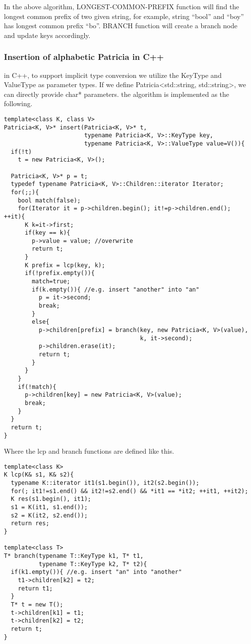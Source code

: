 \documentclass{article}
\begin{document}
In the above algorithm, LONGEST-COMMON-PREFIX function will find the longest
common prefix of two given string, for example, string ``bool'' and ``boy''
has longest common prefix ``bo''. BRANCH function will create a branch node
and update keys accordingly.

\subsubsection*{Insertion of alphabetic Patricia in C++}
in C++, to support implicit type conversion we utilize the KeyType and
ValueType as parameter types. If we define Patricia<std::string,
std::string>, we can directly provide char* parameters. the algorithm
is implemented as the following.

\lstset{language=C++}
\begin{lstlisting}
template<class K, class V>
Patricia<K, V>* insert(Patricia<K, V>* t, 
                       typename Patricia<K, V>::KeyType key, 
                       typename Patricia<K, V>::ValueType value=V()){
  if(!t)
    t = new Patricia<K, V>();

  Patricia<K, V>* p = t;
  typedef typename Patricia<K, V>::Children::iterator Iterator;
  for(;;){
    bool match(false);
    for(Iterator it = p->children.begin(); it!=p->children.end(); ++it){
      K k=it->first;
      if(key == k){
        p->value = value; //overwrite
        return t;
      }
      K prefix = lcp(key, k);
      if(!prefix.empty()){
        match=true;
        if(k.empty()){ //e.g. insert "another" into "an"
          p = it->second;
          break;
        }
        else{
          p->children[prefix] = branch(key, new Patricia<K, V>(value), 
                                       k, it->second);
          p->children.erase(it);
          return t;
        }
      }
    }
    if(!match){
      p->children[key] = new Patricia<K, V>(value);
      break;
    }
  }
  return t;
}
\end{lstlisting}

Where the lcp and branch functions are defined like this.

\begin{lstlisting}
template<class K>
K lcp(K& s1, K& s2){
  typename K::iterator it1(s1.begin()), it2(s2.begin());
  for(; it1!=s1.end() && it2!=s2.end() && *it1 == *it2; ++it1, ++it2);
  K res(s1.begin(), it1);
  s1 = K(it1, s1.end());
  s2 = K(it2, s2.end());
  return res;
}

template<class T>
T* branch(typename T::KeyType k1, T* t1, 
          typename T::KeyType k2, T* t2){
  if(k1.empty()){ //e.g. insert "an" into "another"
    t1->children[k2] = t2;
    return t1;
  }
  T* t = new T();
  t->children[k1] = t1;
  t->children[k2] = t2;
  return t;
}
\end{lstlisting}
\end{document}
